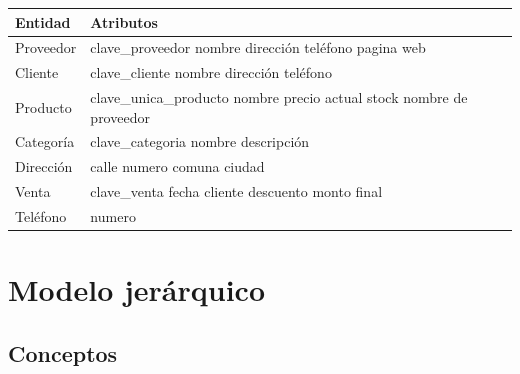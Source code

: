 \documentclass[spanish,12pt,letterpapper]{article}
\begin{document}
		\begin{center}
	\begin{tabular}{| p{4cm} | p{4cm} |}
	\hline
	
	\textbf{Entidad} & \textbf{Atributos}\\
	\hline
	Proveedor & clave\_proveedor \linebreak nombre \linebreak dirección \linebreak teléfono \linebreak pagina web\\
	\hline
	Cliente & clave\_cliente \linebreak nombre \linebreak dirección \linebreak teléfono\\
	\hline
	Producto & clave\_unica\_producto \linebreak nombre \linebreak precio actual \linebreak stock \linebreak nombre de proveedor \\
	\hline
	Categoría & clave\_categoria \linebreak nombre \linebreak descripción \\
	\hline
	Dirección & calle \linebreak numero \linebreak comuna \linebreak ciudad	\\	
	\hline
	Venta & clave\_venta \linebreak fecha \linebreak cliente \linebreak descuento \linebreak monto final \\
	\hline
	Teléfono & numero\\
		
	\hline	
	\end{tabular}
	\end{center}
	
	\section{Modelo jerárquico}
	
	\subsection{Conceptos}
\end{document}
